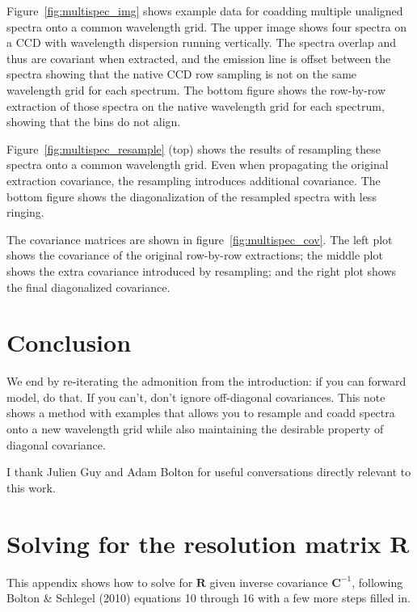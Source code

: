 \documentclass[12pt]{article}
\newcommand{\Ci}{\mathbf{C}^{-1}}
\newcommand{\R}{\mathbf{R}}
\begin{document}
Figure~\ref{fig:multispec_img} shows example data for coadding multiple
unaligned spectra onto a common wavelength grid.  The upper image shows
four spectra on a CCD with wavelength dispersion running vertically.
The spectra overlap and thus are covariant when extracted, and
the emission line is offset between the spectra showing that the native
CCD row sampling is not on the same wavelength grid for each spectrum.
The bottom figure shows the row-by-row extraction of those spectra on
the native wavelength grid for each spectrum, showing that the bins do
not align.

Figure~\ref{fig:multispec_resample} (top) shows the results of resampling
these spectra onto a common wavelength grid.  Even when propagating the
original extraction covariance, the resampling introduces additional
covariance.  The bottom figure shows the diagonalization of the resampled
spectra with less ringing.

The covariance matrices are shown in
figure~\ref{fig:multispec_cov}.  The left plot shows the covariance
of the original row-by-row extractions; the middle plot shows the extra
covariance introduced by resampling; and the right plot shows the final
diagonalized covariance.

\section{Conclusion}

We end by re-iterating the admonition from the introduction:
if you can forward model, do that.  If you can't, don't ignore
off-diagonal covariances.  This note shows a method with examples
that allows you to resample and coadd spectra onto a new wavelength
grid while also maintaining the desirable property of diagonal covariance.

I thank Julien Guy and Adam Bolton for useful conversations directly
relevant to this work.


\appendix
\section{Solving for the resolution matrix $\R$}
\label{sec:solve_R}

This appendix shows how to solve for $\R$ given inverse covariance $\Ci$,
following Bolton \& Schlegel (2010) equations 10 through 16 with a few more 
steps filled in.
\end{document}
